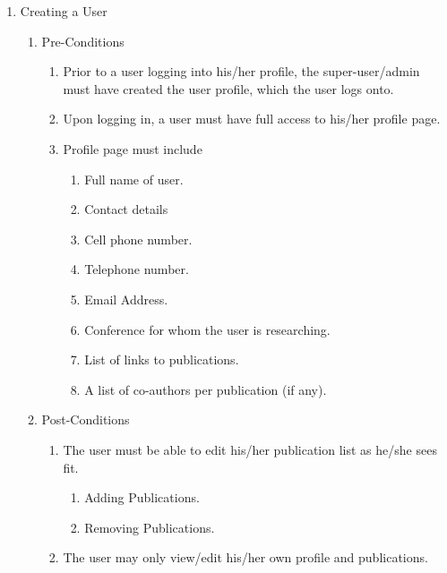 \documentclass{article} %
\begin{document}
	\begin{enumerate}
		\item  Creating a User
		
		\begin{enumerate}
			\item  Pre-Conditions
			
			\begin{enumerate}
				\item  Prior to a user logging into his/her profile, the super-user/admin must have created the user profile, which the user logs onto.
				
				\item  Upon logging in, a user must have full access to his/her profile page.
				
				\item  Profile page must include
				
				\begin{enumerate}
					\item  Full name of user.
					
					\item  Contact details
					
					\item  Cell phone number.
					
					\item  Telephone number.
					
					\item  Email Address.
					
					\item  Conference for whom the user is researching.
					
					\item  List of links to publications.
					
					\item  A list of co-authors per publication (if any).
				\end{enumerate}
			\end{enumerate}
			
			\item  Post-Conditions
			
			\begin{enumerate}
				\item  The user must be able to edit his/her publication list as he/she sees fit.
				
				\begin{enumerate}
					\item  Adding Publications.
					
					\item  Removing Publications.
				\end{enumerate}
				
				\item  The user may only view/edit his/her own profile and publications.
			\end{enumerate}
		\end{enumerate}
	\end{enumerate}
	
\end{document}
